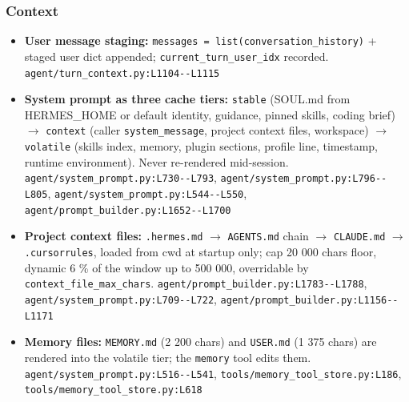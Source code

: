 \subsubsection*{Context}
\begin{itemize}
\item \textbf{User message staging:} \texttt{messages = list(\allowbreak{}conversation\_\allowbreak{}history)} + staged user dict appended; \texttt{current\_\allowbreak{}turn\_\allowbreak{}user\_\allowbreak{}idx} recorded. \texttt{agent/\allowbreak{}turn\_\allowbreak{}context.\allowbreak{}py:\allowbreak{}L1104-\allowbreak{}-\allowbreak{}L1115}
\item \textbf{System prompt as three cache tiers:} \texttt{stable} (SOUL.md from HERMES\_HOME or default identity, guidance, pinned skills, coding brief) $\rightarrow$ \texttt{context} (caller \texttt{system\_\allowbreak{}message}, project context files, workspace) $\rightarrow$ \texttt{volatile} (skills index, memory, plugin sections, profile line, timestamp, runtime environment). Never re-rendered mid-session. \texttt{agent/\allowbreak{}system\_\allowbreak{}prompt.\allowbreak{}py:\allowbreak{}L730-\allowbreak{}-\allowbreak{}L793}, \texttt{agent/\allowbreak{}system\_\allowbreak{}prompt.\allowbreak{}py:\allowbreak{}L796-\allowbreak{}-\allowbreak{}L805}, \texttt{agent/\allowbreak{}system\_\allowbreak{}prompt.\allowbreak{}py:\allowbreak{}L544-\allowbreak{}-\allowbreak{}L550}, \texttt{agent/\allowbreak{}prompt\_\allowbreak{}builder.\allowbreak{}py:\allowbreak{}L1652-\allowbreak{}-\allowbreak{}L1700}
\item \textbf{Project context files:} \texttt{.\allowbreak{}hermes.\allowbreak{}md} $\rightarrow$ \texttt{AGENTS.\allowbreak{}md} chain $\rightarrow$ \texttt{CLAUDE.\allowbreak{}md} $\rightarrow$ \texttt{.\allowbreak{}cursorrules}, loaded from cwd at startup only; cap 20 000 chars floor, dynamic 6 \% of the window up to 500 000, overridable by \texttt{context\_\allowbreak{}file\_\allowbreak{}max\_\allowbreak{}chars}. \texttt{agent/\allowbreak{}prompt\_\allowbreak{}builder.\allowbreak{}py:\allowbreak{}L1783-\allowbreak{}-\allowbreak{}L1788}, \texttt{agent/\allowbreak{}system\_\allowbreak{}prompt.\allowbreak{}py:\allowbreak{}L709-\allowbreak{}-\allowbreak{}L722}, \texttt{agent/\allowbreak{}prompt\_\allowbreak{}builder.\allowbreak{}py:\allowbreak{}L1156-\allowbreak{}-\allowbreak{}L1171}
\item \textbf{Memory files:} \texttt{MEMORY.\allowbreak{}md} (2 200 chars) and \texttt{USER.\allowbreak{}md} (1 375 chars) are rendered into the volatile tier; the \texttt{memory} tool edits them. \texttt{agent/\allowbreak{}system\_\allowbreak{}prompt.\allowbreak{}py:\allowbreak{}L516-\allowbreak{}-\allowbreak{}L541}, \texttt{tools/\allowbreak{}memory\_\allowbreak{}tool\_\allowbreak{}store.\allowbreak{}py:\allowbreak{}L186}, \texttt{tools/\allowbreak{}memory\_\allowbreak{}tool\_\allowbreak{}store.\allowbreak{}py:\allowbreak{}L618}

\end{itemize}
